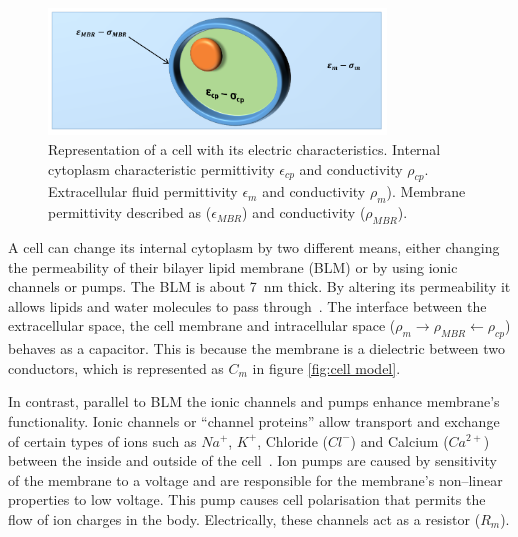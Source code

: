 \begin{figure}[!htpb]
	\centering
	\includegraphics[width=0.8\textwidth,keepaspectratio, trim={0cm 0cm 0cm 0cm},clip]{figure1}    
	\caption[Cell permeability and conductivity distribution]{Representation of a cell with its electric characteristics. Internal cytoplasm characteristic permittivity $\epsilon_{cp}$ and conductivity $\rho_{cp}$. Extracellular fluid permittivity $\epsilon_m$ and conductivity $\rho_m$). Membrane permittivity described as ($\epsilon_{MBR}$) and conductivity ($\rho_{MBR}$).}
	\label{fig:cell}
\end{figure}

A cell can change its internal cytoplasm by two different means, either changing the permeability of their bilayer lipid membrane (BLM) or by using ionic channels or pumps. The BLM is about \SI{7}{\nano\meter} thick. By altering its permeability it allows lipids and water molecules to pass through~\cite{ivorra2003bioimpedance}. The interface between the extracellular space, the cell membrane and intracellular space ($\rho_m \rightarrow \rho_{MBR} \leftarrow \rho_{cp}$) behaves as a capacitor. This is because the membrane is a dielectric between two conductors, which is represented as $C_m$ in figure \ref{fig:cell model}.

In contrast, parallel to BLM the ionic channels and pumps enhance membrane’s functionality. Ionic channels or “channel proteins” allow transport and exchange of certain types of ions such as $Na^{+}$, $K^{+}$, Chloride ($Cl^{-}$) and Calcium ($Ca^{2+}$) between the inside and outside of the cell~\cite{lvovich2012impedance}. Ion pumps are caused by sensitivity of the membrane to a voltage and are responsible for the membrane’s non–linear properties to low voltage. This pump causes cell polarisation that permits the flow of ion charges in the body. Electrically, these channels act as a resistor ($R_m$).

